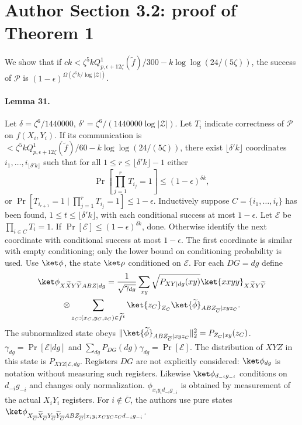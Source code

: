 \section*{Author Section 3.2: proof of Theorem 1}
We show that if $ck<\zeta^5kQ^1_{p,\epsilon+12\zeta}(\widetilde f)/300-k\log\log(24/(5\zeta))$, the success of $\mathcal P$ is $(1-\epsilon)^{\Omega(\zeta^6k/\log|\mathcal Z|)}$.
\paragraph{Lemma 31.} Let $\delta=\zeta^6/1440000$, $\delta'=\zeta^6/(1440000\log|\mathcal Z|)$. Let $T_i$ indicate correctness of $\mathcal P$ on $f(X_i,Y_i)$. If its communication is $<\zeta^5kQ^1_{p,\epsilon+12\zeta}(\widetilde f)/60-k\log\log(24/(5\zeta))$, there exist $\lfloor\delta'k\rfloor$ coordinates $i_1,\ldots,i_{\lfloor\delta'k\rfloor}$ such that for all $1\le r\le\lfloor\delta'k\rfloor-1$ either
\[\Pr[\prod_{j=1}^rT_{i_j}=1]\le(1-\epsilon)^{\delta k},\]
or $\Pr[T_{i_{r+1}}=1\mid\prod_{j=1}^rT_{i_j}=1]\le1-\epsilon$.
Inductively suppose $C=\{i_1,\ldots,i_t\}$ has been found, $1\le t\le\lfloor\delta'k\rfloor$, with each conditional success at most $1-\epsilon$. Let $\mathcal E$ be $\prod_{i\in C}T_i=1$. If $\Pr[\mathcal E]\le(1-\epsilon)^{\delta k}$, done. Otherwise identify the next coordinate with conditional success at most $1-\epsilon$. The first coordinate is similar with empty conditioning; only the lower bound on conditioning probability is used.
Use $\ket\phi$, the state $\ket\rho$ conditioned on $\mathcal E$. For each $DG=dg$ define
\begin{multline*}\ket\phi_{X\widetilde XY\widetilde YABZ|dg}=\frac1{\sqrt{\gamma_{dg}}}\sum_{xy}\sqrt{P_{XY|dg}(xy)}\ket{xxyy}_{X\widetilde XY\widetilde Y}\\\otimes\sum_{z_C:(x_C,y_C,z_C)\in\widetilde f^t}\ket{z_C}_{Z_C}\ket{\widetilde\phi}_{ABZ_{\overline C}|xyz_C}.
\end{multline*}
The subnormalized state obeys $\|\ket{\widetilde\phi}_{ABZ_{\overline C}|xyz_C}\|_2^2=P_{Z_C|xy}(z_C)$. $\gamma_{dg}=\Pr[\mathcal E|dg]$ and $\sum_{dg}P_{DG}(dg)\gamma_{dg}=\Pr[\mathcal E]$. The distribution of $XYZ$ in this state is $P_{XYZ|\mathcal E,dg}$. Registers $DG$ are not explicitly considered: $\ket\phi_{dg}$ is notation without measuring such registers. Likewise $\ket\phi_{d_{-i}g_{-i}}$ conditions on $d_{-i}g_{-i}$ and changes only normalization. $\phi_{x_iy_id_{-i}g_{-i}}$ is obtained by measurement of the actual $X_iY_i$ registers. For $i\notin\overline C$, the authors use pure states $\ket\phi_{X_{\overline C}\widetilde X_{\overline C}Y_{\overline C}\widetilde Y_{\overline C}ABZ_{\overline C}|x_iy_ix_Cy_Cz_Cd_{-i}g_{-i}}$.
